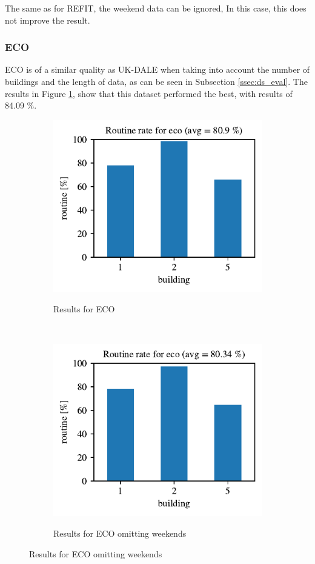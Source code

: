 The same as for REFIT, the weekend data can be ignored,
In this case, this does not improve the result. 
\subsubsection{ECO}

ECO is of a similar quality as UK-DALE when taking into account the number of buildings and the length of data, as can be seen in Subsection \ref{ssec:ds_eval}.
The results in Figure \ref{fig:eco_res}, show that this dataset performed the best, with results of 84.09 \%.

\begin{figure}[H]
	\begin{subfigure}{.5\textwidth}
        \caption{Results for ECO}
        \includegraphics[width=1\textwidth]{Figures/EC/eco_res_nw_1.pdf}
        \label{fig:eco_res}
    \end{subfigure}
    ~ 
    \begin{subfigure}{.5\textwidth}
        \caption{Results for ECO omitting weekends}
        \includegraphics[width=1\textwidth]{Figures/EC/eco_res.pdf}
        \label{fig:eco_res_nw}
    \end{subfigure}
\end{figure}

